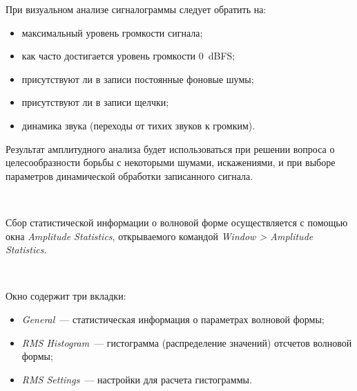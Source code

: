 \documentclass{beamer}
\begin{document}
\begin{frame}
При визуальном анализе сигналограммы следует обратить на:
\begin{itemize}
\item максимальный уровень громкости сигнала;
\item как часто достигается уровень громкости $0$~dBFS;
\item присутствуют ли в записи постоянные фоновые шумы;
\item присутствуют ли в записи щелчки;
\item динамика звука (переходы от тихих звуков к громким).
\end{itemize}
\end{frame}   

\begin{frame}
Результат амплитудного анализа будет использоваться при решении вопроса о целесообразности борьбы с некоторыми шумами, искажениями, и при выборе параметров динамической обработки записанного сигнала.

~

Сбор статистической информации о волновой форме осуществляется с помощью окна \textit{Amplitude Statistics}, открываемого командой \textit{Window > Amplitude Statistics}.

~

Окно содержит три вкладки: 
\begin{itemize}
\item \textit{General}~--- статистическая информация о параметрах волновой формы;
\item \textit{RMS Histogram}~--- гистограмма (распределение значений) отсчетов волновой формы;
\item \textit{RMS Settings}~--- настройки для расчета гистограммы.
\end{itemize}
\end{frame}   
\end{document}
